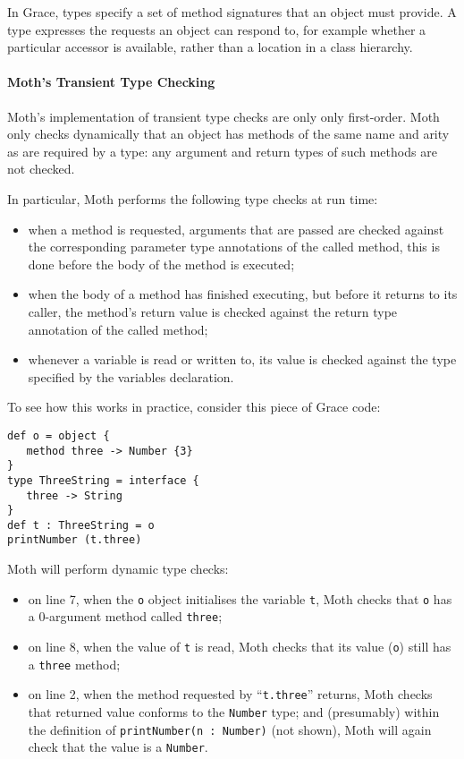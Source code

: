 \documentclass[sigplan,screen]{acmart}
\newcommand{\code}[1]{\texttt{#1}}
\begin{document}
In Grace, types specify a set of method signatures that an object must provide. A type expresses the requests an object can respond to, for example whether a particular accessor is available, rather than a location in a class hierarchy.

\paragraph{Moth's Transient Type Checking}
Moth's implementation of transient type checks are only only first-order.
Moth only checks dynamically that an object has methods of the same name and arity as are required by a type:  any argument and return types of such methods are not checked.

In particular, Moth performs the following type checks at run time:
\begin{itemize}
\item when a method is requested, arguments that are passed are checked against the corresponding parameter type annotations of the called method, this is done before the body of the method is executed;
\item when the body of a method has finished executing, but before it returns to its caller, the method's return value is checked against the return type annotation of the called method;
\item whenever a variable is read or written to, its value is checked against the type specified by the variables declaration.
\end{itemize}

To see how this works in practice, consider this piece of Grace code:

\begin{minipage}{\linewidth}
\begin{lstlisting}
def o = object {
   method three -> Number {3}
}
type ThreeString = interface {
   three -> String
}
def t : ThreeString = o
printNumber (t.three)
\end{lstlisting}
\end{minipage}

Moth will perform dynamic type checks:

\begin{itemize}

\item on line 7,
when the \code{o} object initialises the variable \code{t},
Moth checks that \code{o} has a 0-argument method called \code{three};

\item on line 8,
when the value of \code{t} is read,
Moth checks that its value (\code{o}) still has a \code{three} method;

\item on line 2,
when the method requested by ``\code{t.three}'' returns,
Moth checks that returned value conforms to the \code{Number} type;
and (presumably) within the definition of
%
\code{printNumber(n :   Number)}
%
(not shown), Moth will again check that the value is a \code{Number}.
\end{itemize}
\end{document}
